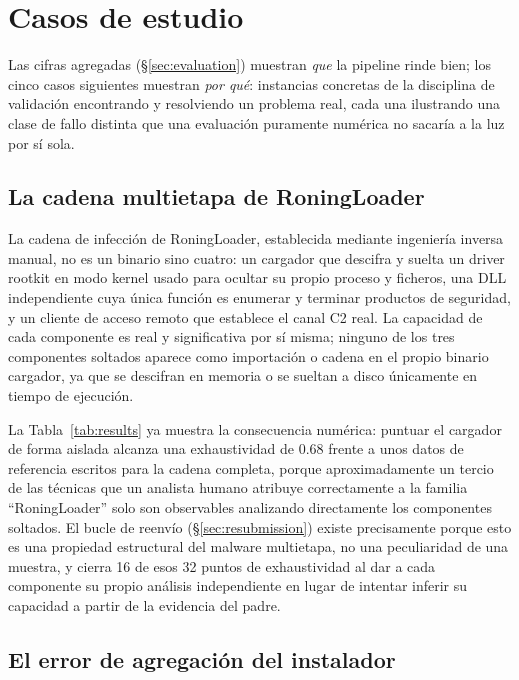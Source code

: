 \section{Casos de estudio}
\label{sec:case-studies}

Las cifras agregadas (\S\ref{sec:evaluation}) muestran \emph{que} la
pipeline rinde bien; los cinco casos siguientes muestran \emph{por
qu\'e}: instancias concretas de la disciplina de validaci\'on
encontrando y resolviendo un problema real, cada una ilustrando una
clase de fallo distinta que una evaluaci\'on puramente num\'erica no
sacar\'ia a la luz por s\'i sola.

\subsection{La cadena multietapa de RoningLoader}
\label{sec:case-roning}

La cadena de infecci\'on de RoningLoader, establecida mediante
ingenier\'ia inversa manual, no es un binario sino cuatro: un cargador
que descifra y suelta un driver rootkit en modo kernel usado para
ocultar su propio proceso y ficheros, una DLL independiente cuya
\'unica funci\'on es enumerar y terminar productos de seguridad, y un
cliente de acceso remoto que establece el canal C2 real. La capacidad
de cada componente es real y significativa por s\'i misma; ninguno de
los tres componentes soltados aparece como importaci\'on o cadena en el
propio binario cargador, ya que se descifran en memoria o se sueltan a
disco \'unicamente en tiempo de ejecuci\'on.

La Tabla~\ref{tab:results} ya muestra la consecuencia num\'erica:
puntuar el cargador de forma aislada alcanza una exhaustividad de 0.68
frente a unos datos de referencia escritos para la cadena completa,
porque aproximadamente un tercio de las t\'ecnicas que un analista
humano atribuye correctamente a la familia ``RoningLoader'' solo son
observables analizando directamente los componentes soltados. El
bucle de reenv\'io (\S\ref{sec:resubmission}) existe precisamente
porque esto es una propiedad estructural del malware multietapa, no
una peculiaridad de una muestra, y cierra 16 de esos 32 puntos de
exhaustividad al dar a cada componente su propio an\'alisis
independiente en lugar de intentar inferir su capacidad a partir de la
evidencia del padre.

\subsection{El error de agregaci\'on del instalador}
\label{sec:case-installer}

